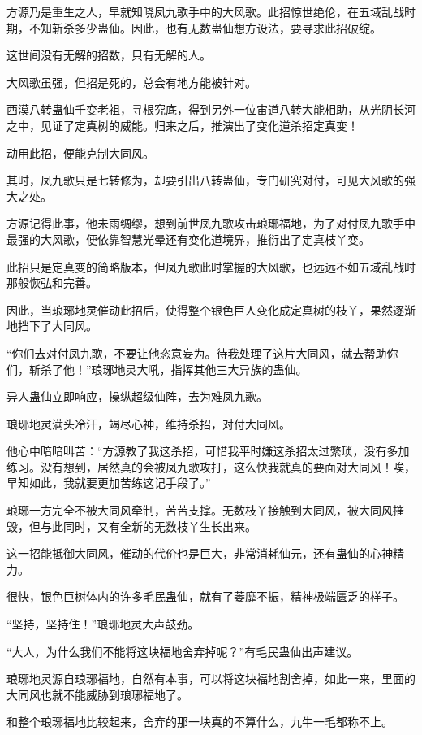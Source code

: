 \begin{this_body}
方源乃是重生之人，早就知晓凤九歌手中的大风歌。此招惊世绝伦，在五域乱战时期，不知斩杀多少蛊仙。因此，也有无数蛊仙想方设法，要寻求此招破绽。

这世间没有无解的招数，只有无解的人。

大风歌虽强，但招是死的，总会有地方能被针对。

西漠八转蛊仙千变老祖，寻根究底，得到另外一位宙道八转大能相助，从光阴长河之中，见证了定真树的威能。归来之后，推演出了变化道杀招定真变！

动用此招，便能克制大同风。

其时，凤九歌只是七转修为，却要引出八转蛊仙，专门研究对付，可见大风歌的强大之处。

方源记得此事，他未雨绸缪，想到前世凤九歌攻击琅琊福地，为了对付凤九歌手中最强的大风歌，便依靠智慧光晕还有变化道境界，推衍出了定真枝丫变。

此招只是定真变的简略版本，但凤九歌此时掌握的大风歌，也远远不如五域乱战时那般恢弘和完善。

因此，当琅琊地灵催动此招后，使得整个银色巨人变化成定真树的枝丫，果然逐渐地挡下了大同风。

“你们去对付凤九歌，不要让他恣意妄为。待我处理了这片大同风，就去帮助你们，斩杀了他！”琅琊地灵大吼，指挥其他三大异族的蛊仙。

异人蛊仙立即响应，操纵超级仙阵，去为难凤九歌。

琅琊地灵满头冷汗，竭尽心神，维持杀招，对付大同风。

他心中暗暗叫苦：“方源教了我这杀招，可惜我平时嫌这杀招太过繁琐，没有多加练习。没有想到，居然真的会被凤九歌攻打，这么快我就真的要面对大同风！唉，早知如此，我就要更加苦练这记手段了。”

琅琊一方完全不被大同风牵制，苦苦支撑。无数枝丫接触到大同风，被大同风摧毁，但与此同时，又有全新的无数枝丫生长出来。

这一招能抵御大同风，催动的代价也是巨大，非常消耗仙元，还有蛊仙的心神精力。

很快，银色巨树体内的许多毛民蛊仙，就有了萎靡不振，精神极端匮乏的样子。

“坚持，坚持住！”琅琊地灵大声鼓劲。

“大人，为什么我们不能将这块福地舍弃掉呢？”有毛民蛊仙出声建议。

琅琊地灵源自琅琊福地，自然有本事，可以将这块福地割舍掉，如此一来，里面的大同风也就不能威胁到琅琊福地了。

和整个琅琊福地比较起来，舍弃的那一块真的不算什么，九牛一毛都称不上。


\end{this_body}
